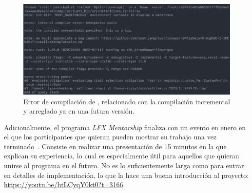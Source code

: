 \begin{figure}[H]
    \centering
    \includegraphics[width=\textwidth]{./Imagenes/rustc_crash.png}
    \caption{Error de compilación de , relacionado con la
    compilación incremental y arreglado ya en una futura
    versión.}%
    \label{fig:rustc_crash}
\end{figure}

Adicionalmente, el programa \emph{LFX Mentorship} finaliza con un evento en
enero en el que los participantes que quieran pueden mostrar su trabajo una vez
terminado~\cite{lfx_showcase}. Consiste en realizar una presentación de 15
minutos en la que explican su experiencia, lo cual es especialmente útil para
aquellos que quieran unirse al programa en el futuro. No es lo suficientemente
larga como para entrar en detalles de implementación, lo que la hace una buena
introducción al proyecto: \url{https://youtu.be/htLCyqY0kt0?t=3166}.
